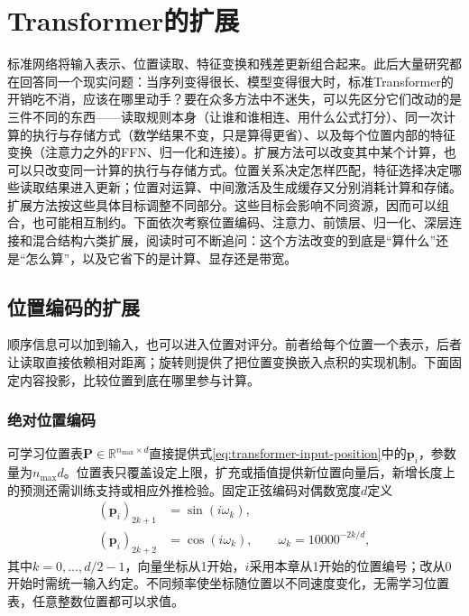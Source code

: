 \FloatBarrier
\section{Transformer的扩展}
\label{sec:transformer-extensions}

标准网络将输入表示、位置读取、特征变换和残差更新组合起来。此后大量研究都在回答同一个现实问题：当序列变得很长、模型变得很大时，标准Transformer的开销吃不消，应该在哪里动手？要在众多方法中不迷失，可以先区分它们改动的是三件不同的东西——读取规则本身（让谁和谁相连、用什么公式打分）、同一次计算的执行与存储方式（数学结果不变，只是算得更省）、以及每个位置内部的特征变换（注意力之外的FFN、归一化和连接）。扩展方法可以改变其中某个计算，也可以只改变同一计算的执行与存储方式。位置关系决定怎样匹配，特征选择决定哪些读取结果进入更新；位置对运算、中间激活及生成缓存又分别消耗计算和存储。扩展方法按这些具体目标调整不同部分。这些目标会影响不同资源，因而可以组合，也可能相互制约。下面依次考察位置编码、注意力、前馈层、归一化、深层连接和混合结构六类扩展，阅读时可不断追问：这个方法改变的到底是“算什么”还是“怎么算”，以及它省下的是计算、显存还是带宽。

\subsection{位置编码的扩展}
\label{sec:transformer-position-extensions}

顺序信息可以加到输入，也可以进入位置对评分。前者给每个位置一个表示，后者让读取直接依赖相对距离；旋转则提供了把位置变换嵌入点积的实现机制。下面固定内容投影，比较位置到底在哪里参与计算。

\subsubsection{绝对位置编码}

可学习位置表$\bm P\in\mathbb R^{n_{\max}\times d}$直接提供式\eqref{eq:transformer-input-position}中的$\bm p_i$，参数量为$n_{\max}d$。位置表只覆盖设定上限，扩充或插值提供新位置向量后，新增长度上的预测还需训练支持或相应外推检验。固定正弦编码对偶数宽度$d$定义
\begin{equation}
  \begin{aligned}
    (\bm p_i)_{2k+1}&=\sin(i\omega_k),\\
    (\bm p_i)_{2k+2}&=\cos(i\omega_k),\qquad
    \omega_k=10000^{-2k/d},
  \end{aligned}
  \label{eq:transformer-sinusoidal-position}
\end{equation}
其中$k=0,\ldots,d/2-1$，向量坐标从1开始，$i$采用本章从1开始的位置编号；改从0开始时需统一输入约定。不同频率使坐标随位置以不同速度变化，无需学习位置表，任意整数位置都可以求值。

